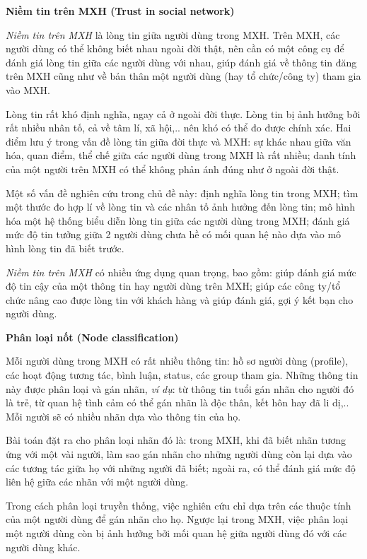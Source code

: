 \documentclass[12pt]{extarticle}
\begin{document}
			\par \textbf{Niềm tin trên MXH (Trust in social network)}
			\par \textit{Niềm tin trên MXH} là lòng tin giữa người dùng trong MXH. Trên MXH, các người dùng có thể không biết nhau ngoài đời thật, nên cần có một công cụ để đánh giá lòng tin giữa các người dùng với nhau, giúp đánh giá về thông tin đăng trên MXH cũng như về bản thân một người dùng (hay tổ chức/công ty) tham gia vào MXH.
			\par Lòng tin rất khó định nghĩa, ngay cả ở ngoài đời thực. Lòng tin bị ảnh hưởng bởi rất nhiều nhân tố, cả về tâm lí, xã hội,.. nên khó có thể đo được chính xác. Hai điểm lưu ý trong vấn đề lòng tin giữa đời thực và MXH: sự khác nhau giữa văn hóa, quan điểm, thể chế giữa các người dùng trong MXH là rất nhiều; danh tính của một người trên MXH có thể không phản ánh đúng như ở ngoài đời thật.
			\par Một số vấn đề nghiên cứu trong chủ đề này: định nghĩa lòng tin trong MXH; tìm một thước đo hợp lí về lòng tin và các nhân tố ảnh hưởng đến lòng tin; mô hình hóa một hệ thống biểu diễn lòng tin giữa các người dùng trong MXH; đánh giá mức độ tin tưởng giữa 2 người dùng chưa hề có mối quan hệ nào dựa vào mô hình lòng tin đã biết trước.
			\par \textit{Niềm tin trên MXH} có nhiều ứng dụng quan trọng, bao gồm: giúp đánh giá mức độ tin cậy của một thông tin hay người dùng trên MXH; giúp các công ty/tổ chức nâng cao được lòng tin với khách hàng và giúp đánh giá, gợi ý kết bạn cho người dùng.
			\par \textbf{Phân loại nốt (Node classification)}
			\par Mỗi người dùng trong MXH có rất nhiều thông tin: hồ sơ người dùng (profile), các hoạt động tương tác, bình luận, status, các group tham gia. Những thông tin này được phân loại và gán nhãn, \textit{ví dụ}: từ thông tin tuổi gán nhãn cho người đó là trẻ, từ quan hệ tình cảm có thể gán nhãn là độc thân, kết hôn hay đã li dị,.. Mỗi người sẽ có nhiều nhãn dựa vào thông tin của họ.
			\par Bài toán đặt ra cho phân loại nhãn đó là: trong MXH, khi đã biết nhãn tương ứng với một vài người, làm sao gán nhãn cho những người dùng còn lại dựa vào các tương tác giữa họ với những người đã biết; ngoài ra, có thể đánh giá mức độ liên hệ giữa các nhãn với một người dùng.
			\par Trong cách phân loại truyền thống, việc nghiên cứu chỉ dựa trên các thuộc tính của một người dùng để gán nhãn cho họ. Ngược lại trong MXH, việc phân loại một người dùng còn bị ảnh hưởng bởi mối quan hệ giữa người dùng đó với các người dùng khác.
\end{document}
